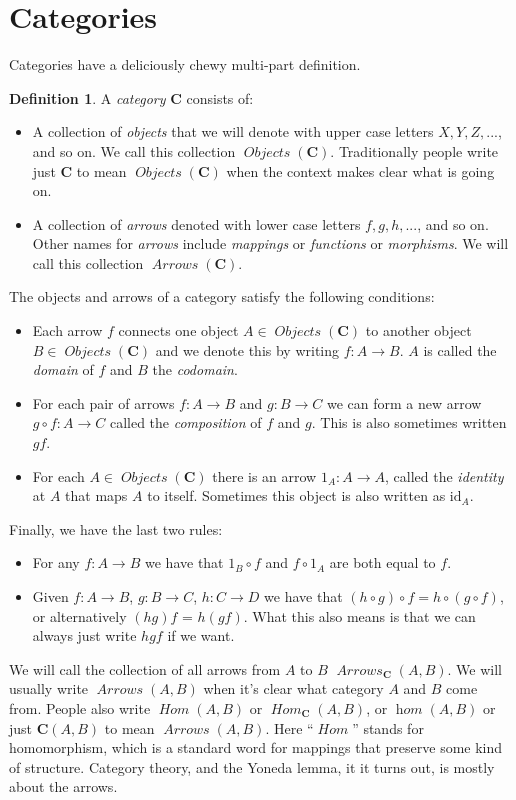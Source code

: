 \documentclass[12pt]{article}
\theoremstyle{definition}
\theoremstyle{definition}
\newtheorem{defn}{Definition}[]
\theoremstyle{definition}
\numberwithin{equation}{section}
\newcommand{\cat}[1]{\mathbf{#1}}      %
\newcommand{\id}{\mathrm{id}} %
\newcommand{\CC}{\cat{C}}
\DeclareMathOperator{\Arrows}{\mathit{Arrows}}
\DeclareMathOperator{\Objects}{\mathit{Objects}}
\DeclareMathOperator{\Hom}{\mathit{Hom}}
\DeclareMathOperator{\ihom}{\mathit{hom}}
\def\objc{\Objects(\cat{C})}
\def\ni{\goodbreak\noindent}
\begin{document}
\goodbreak
\section{Categories}

Categories have a deliciously chewy multi-part definition.

\begin{defn}
\label{category}
A {\it category} $\CC$ consists of:
%
\begin{itemize}
\item 
A collection of {\it objects} that we will denote with upper case letters $X, Y, Z, ...$,
and so on.  
We call this collection $\objc$. Traditionally people write just $\CC$ to mean $\objc$
when the context makes clear what is going on.
\item
A collection of {\it arrows} denoted with lower case letters $f, g, h, ...$, and so on.
Other names for {\it arrows} include {\it mappings} or {\it functions} or {\it morphisms}.
We will call this collection $\Arrows(\CC)$. \end{itemize}%
The objects and arrows of a category satisfy the following conditions:
\begin{itemize}
\item
Each arrow $f$ connects one object $A \in \objc$ to another object $B \in \objc$ and we denote
this by writing $f: A \to B$. $A$ is called the {\it domain} of $f$ and $B$ the {\it
codomain}.
\item
For each pair of arrows $f:A \to B$ and $g : B \to C$ we can form a new arrow $g \circ f:
A \to C$ called the {\it composition} of $f$ and $g$. This is also sometimes written $gf$.
\item
For each $A \in \objc$ there is an arrow $1_A: A \to A$, called the {\it identity} at
$A$ that maps $A$ to itself. Sometimes this object is also written as $\id_A$.
\end{itemize}
\goodbreak\ni Finally, we have the last two rules:

\begin{itemize}
\item For any $f: A \to B$ we have that $1_B \circ f$ and $f \circ 1_A$ are both equal to
$f$. 
\item Given $f: A \to B$, $g: B \to C$, $h: C\to D$ we have that $(h \circ g) \circ f = h
\circ (g \circ f)$, or alternatively $(hg)f$ = $h(gf)$. What this also means is that we
can always just write $hgf$ if we want. \end{itemize}%
\end{defn}%
\ni
We will call the collection of all arrows from $A$ to $B$ $\Arrows_{\CC}(A, B)$. We will
usually write $\Arrows(A,B)$ when it's clear what category $A$ and $B$ come from. People
also write $\Hom(A, B)$ or $\Hom_{\CC}(A,B)$, or $\ihom(A, B)$ or just $\CC(A,B)$ to mean
$\Arrows(A,B)$. Here ``$\Hom$'' stands for homomorphism, which is a standard word for
mappings that preserve some kind of structure. Category theory, and the Yoneda lemma, it
it turns out, is mostly about the arrows.
\end{document}
